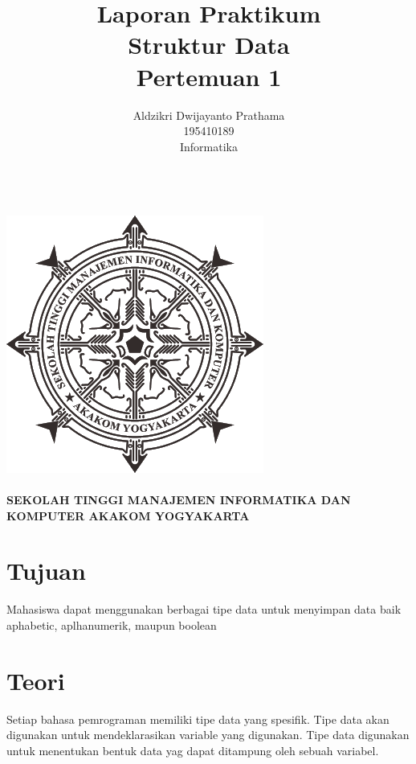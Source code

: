 \documentclass[a4paper,12pt]{article}
\begin{document}
\title{ {\Large Laporan Praktikum}\\ Struktur Data\\{\Large Pertemuan 1}}

\author{Aldzikri Dwijayanto Prathama
    \\195410189
    \\Informatika}
\makeatletter
\begin{titlepage}
    \begin{center}
        {\huge \bfseries \@title}\\[14ex]
        \includegraphics[scale=.8]{logo}\\[4ex]
        {\large \@author}\\[12ex]
        {\large \bfseries {SEKOLAH TINGGI MANAJEMEN INFORMATIKA DAN KOMPUTER
            AKAKOM YOGYAKARTA}}
    \end{center}


\end{titlepage}
\makeatother
\newpage
\tableofcontents
\newpage

\section{Tujuan}
Mahasiswa dapat menggunakan berbagai tipe data untuk menyimpan data baik aphabetic, 
aplhanumerik, maupun boolean
\section{Teori}
 
Setiap bahasa pemrograman memiliki tipe data yang spesifik. Tipe data akan 
digunakan untuk mendeklarasikan variable yang digunakan. Tipe data digunakan untuk 
menentukan bentuk data yag dapat ditampung oleh sebuah variabel.\\
 
\end{document}

